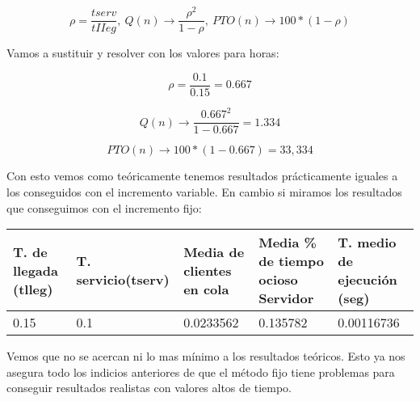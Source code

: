\documentclass[]{article}
\begin{document}
$$\rho=\frac{ { tserv }}{ { tII eg }},\ Q(n) \rightarrow \frac{\rho^{2}}{1-\rho},\ P T O(n) \rightarrow 100 *(1-\rho)$$

Vamos a sustituir y resolver con los valores para horas:

$$\rho=\frac{ { 0.1 }}{ { 0.15 }} = 0.667 $$

$$Q(n) \rightarrow \frac{0.667^{2}}{1-0.667} = 1.334 $$

$$P T O(n) \rightarrow 100*(1-0.667) = 33,334$$

Con esto vemos como teóricamente tenemos resultados prácticamente iguales a los conseguidos con el incremento variable. En cambio si miramos los resultados que conseguimos con el incremento fijo:
\begin{table}[H]
	\begin{center}
		\begin{tabularx}{0.9\textwidth}{|X|X|X|X|X|}
			\hline
			\textbf{T. de llegada (tlleg)} & \textbf{T. servicio(tserv)}&\textbf{Media de clientes en cola} & \textbf{Media \% de tiempo ocioso Servidor} & \textbf{T. medio de ejecución (seg)} \\
			\hline \hline
			0.15 & 0.1 & 0.0233562 & 0.135782 &0.00116736\\ \hline
		\end{tabularx}
		
	\end{center}
\end{table}

Vemos que no se acercan ni lo mas mínimo a los resultados teóricos. Esto ya nos asegura todo los indicios anteriores de que el método fijo tiene problemas para conseguir resultados realistas con valores altos de tiempo.
\end{document}
